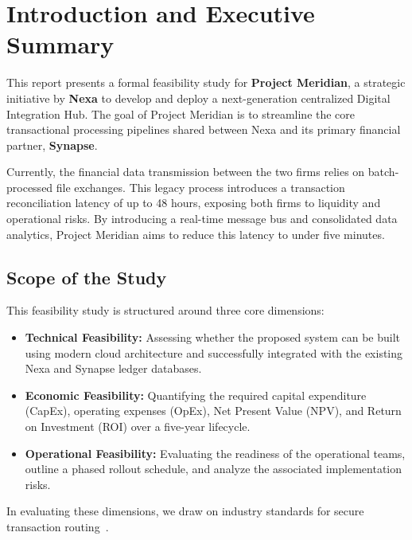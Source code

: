 \section{Introduction and Executive Summary}
\label{sec:introduction}

This report presents a formal feasibility study for \textbf{Project Meridian}, a strategic initiative by \textbf{Nexa} to develop and deploy a next-generation centralized Digital Integration Hub. The goal of Project Meridian is to streamline the core transactional processing pipelines shared between Nexa and its primary financial partner, \textbf{Synapse}. 

Currently, the financial data transmission between the two firms relies on batch-processed file exchanges. This legacy process introduces a transaction reconciliation latency of up to 48 hours, exposing both firms to liquidity and operational risks. By introducing a real-time message bus and consolidated data analytics, Project Meridian aims to reduce this latency to under five minutes.

\vspace{1.2em}
\subsection{Scope of the Study}
This feasibility study is structured around three core dimensions:
\begin{itemize}[leftmargin=1.5em]
  \item \textbf{Technical Feasibility:} Assessing whether the proposed system can be built using modern cloud architecture and successfully integrated with the existing Nexa and Synapse ledger databases.
  \item \textbf{Economic Feasibility:} Quantifying the required capital expenditure (CapEx), operating expenses (OpEx), Net Present Value (NPV), and Return on Investment (ROI) over a five-year lifecycle.
  \item \textbf{Operational Feasibility:} Evaluating the readiness of the operational teams, outline a phased rollout schedule, and analyze the associated implementation risks.
\end{itemize}
In evaluating these dimensions, we draw on industry standards for secure transaction routing~\cite{jenkins2023enterprise}.
